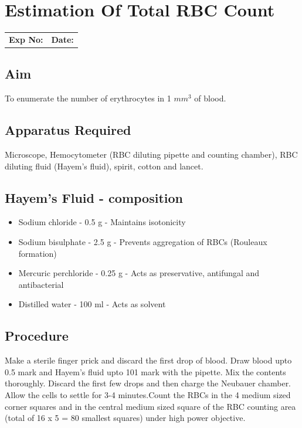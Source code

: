 \documentclass[a4paper,12pt]{book}
\begin{document}
					\chapter*{\centering Estimation Of Total RBC Count}

					\begin{tabular}{p{5in} p{1in}}
						\textbf{Exp No:}  & \textbf{Date:}\\
					\end{tabular}

					\section*{Aim}

					To enumerate the number of  erythrocytes in 1 $mm^3$ of blood.
					\section*{Apparatus Required}
					Microscope, Hemocytometer (RBC diluting pipette and counting chamber), RBC diluting fluid (Hayem’s fluid), spirit, cotton and lancet.

					\section*{Hayem's Fluid - composition}
					\begin{itemize}

						\item{		Sodium chloride - 0.5 g	- Maintains isotonicity}
						\item{		Sodium bisulphate - 2.5 g - Prevents aggregation  of RBCs (Rouleaux formation)}
						\item{		Mercuric perchloride - 0.25 g - Acts  as preservative, antifungal and antibacterial}
						\item{		Distilled water - 100 ml - Acts as solvent}
					\end{itemize}


					\section*{Procedure}

					Make  a  sterile  finger  prick  and  discard  the  first drop  of blood. Draw blood upto  0.5  mark  and  Hayem’s  fluid  upto 101  mark  with  the  pipette. Mix  the contents thoroughly. Discard  the  first  few  drops and then charge  the  Neubauer chamber. Allow  the cells to  settle  for  3-4  minutes.Count the RBCs in the 4 medium sized corner squares and  in the central medium sized square of the RBC counting area (total of 16 x 5 = 80 smallest squares) under high power objective.
\end{document}
